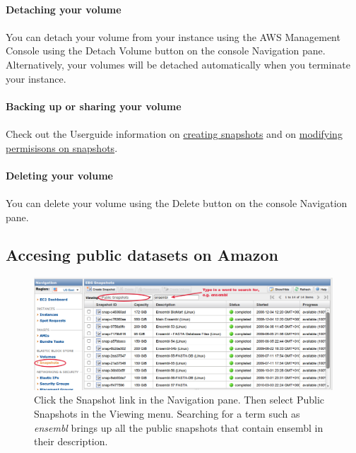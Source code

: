 \paragraph{Detaching your volume}
\paragraph{}You can detach your volume from your instance using the AWS Management Console using the Detach Volume button on the console Navigation pane. Alternatively, your volumes will be detached automatically when you terminate your instance.

\paragraph{Backing up or sharing your volume}
\paragraph{}Check out the Userguide information on \href{http://docs.amazonwebservices.com/AWSEC2/latest/UserGuide/creating-snapshot-ebs.html}{creating snapshots} and on \href{http://docs.amazonwebservices.com/AWSEC2/latest/UserGuide/modifying-snapshot-permissions-ebs.html}{modifying permisisons on snapshots}.


\paragraph{Deleting your volume}
\paragraph{}You can delete your volume using the Delete button on the console Navigation pane. 

\subsection{Accesing public datasets on Amazon}

\begin{figure}[!hd]
\includegraphics[width=\maxwidth]{"images/public-ensembl"}
\caption[List public data]{\label{fig:ensembl}Click the Snapshot link in the Navigation pane. Then select Public Snapshots in the Viewing menu. Searching for a term such as \emph{ensembl} brings up all the public snapshots that contain ensembl in their description. }
\end{figure}

